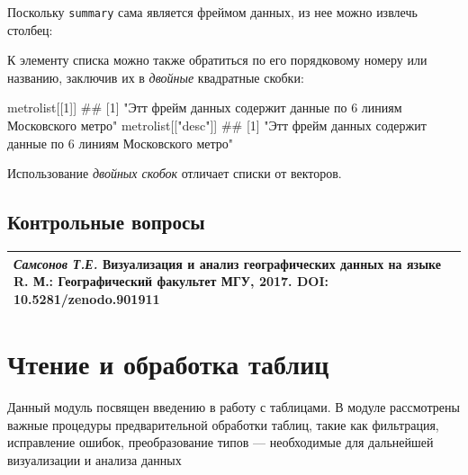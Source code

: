 \documentclass[]{book}
\newenvironment{Shaded}{\begin{snugshade}}{\end{snugshade}}
\newcommand{\DecValTok}[1]{\textcolor[rgb]{0.00,0.00,0.81}{#1}}
\newcommand{\StringTok}[1]{\textcolor[rgb]{0.31,0.60,0.02}{#1}}
\newcommand{\OperatorTok}[1]{\textcolor[rgb]{0.81,0.36,0.00}{\textbf{#1}}}
\newcommand{\NormalTok}[1]{#1}
\begin{document}
Поскольку \texttt{summary} сама является фреймом данных, из нее можно
извлечь столбец:

\begin{Shaded}
\end{Shaded}

К элементу списка можно также обратиться по его порядковому номеру или
названию, заключив их в \emph{двойные} квадратные скобки:

\begin{Shaded}
\begin{Highlighting}[]
\NormalTok{metrolist[[}\DecValTok{1}\NormalTok{]]}
\NormalTok{## [1] "Этт фрейм данных содержит данные по 6 линиям Московского метро"}
\NormalTok{metrolist[[}\StringTok{"desc"}\NormalTok{]]}
\NormalTok{## [1] "Этт фрейм данных содержит данные по 6 линиям Московского метро"}
\end{Highlighting}
\end{Shaded}

Использование \emph{двойных скобок} отличает списки от векторов.

\section{Контрольные вопросы}\label{questions_matrix}

\begin{longtable}[]{@{}l@{}}
\toprule
\emph{Самсонов Т.Е.} \textbf{Визуализация и анализ географических данных
на языке R.} М.: Географический факультет МГУ, 2017. DOI:
10.5281/zenodo.901911\tabularnewline
\bottomrule
\end{longtable}

\chapter{Чтение и обработка таблиц}\label{tables}

Данный модуль посвящен введению в работу с таблицами. В модуле
рассмотрены важные процедуры предварительной обработки таблиц, такие как
фильтрация, исправление ошибок, преобразование типов --- необходимые для
дальнейшей визуализации и анализа данных
\end{document}
